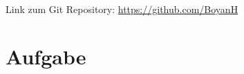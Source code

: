 \usepackage{graphicx}
\usepackage{fancyvrb}

\newcommand{\dozent}{Prof. Dr. Agn`es Voisard, Nicolas Lehmann}					%
\newcommand{\tutor}{Nicolas Lehmann}						%
\newcommand{\tutoriumNo}{6}				%
\newcommand{\projectNo}{2}									%
\newcommand{\veranstaltung}{Datenbanksysteme}	%
\newcommand{\semester}{SoSe 2017}						%
\newcommand{\studenten}{Boyan Hristov, Julian Habib}			%





Link zum Git Repository: \url{https://github.com/BoyanH}

\section{Aufgabe}


